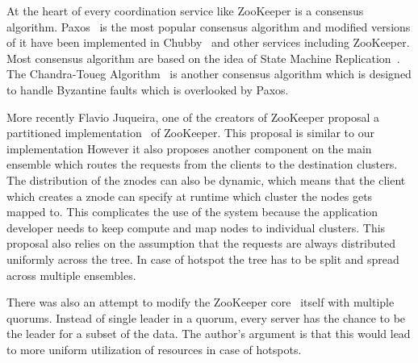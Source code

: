 At the heart of every coordination service like ZooKeeper is a consensus algorithm. Paxos~\cite{lamport2001paxos} is the most popular consensus algorithm and modified versions of it have been implemented in Chubby~\cite{burrows2006chubby} and other services including ZooKeeper. Most consensus algorithm are based on the idea of State Machine Replication~\cite{schneider1990implementing}. 
The Chandra-Toueg Algorithm~\cite{Chandra:1996:UFD:226643.226647} is another consensus algorithm which is designed to handle Byzantine faults which is overlooked by Paxos.

More recently Flavio Juqueira, one of the creators of ZooKeeper proposal a partitioned implementation~\cite{junqueira2010partitioned} of ZooKeeper. This proposal is similar to our implementation However it also proposes another component on the main ensemble which routes the requests from the clients to the destination clusters. The distribution of the znodes can also be dynamic, which means that the client which creates a znode can specify at runtime which cluster the nodes gets mapped to. This complicates the use of the system because the application developer needs to keep compute and map nodes to individual clusters. This proposal also relies on the assumption that the requests are always distributed uniformly across the tree. In case of hotspot the tree has to be split and spread across multiple ensembles.

There was also an attempt to modify the ZooKeeper core~\cite{biligiri2014multiquorum} itself with multiple quorums. Instead of single leader in a quorum, every server has the chance to be the leader for a subset of the data. The author's argument is that this would lead to more uniform utilization of resources in case of hotspots. 
